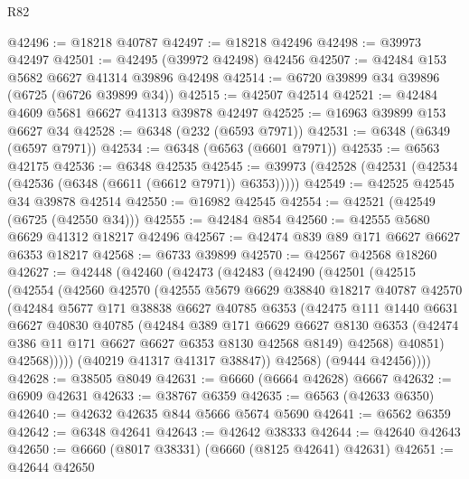 \begin{lexlean}{R82}
\begin{coremodule}
@42496 := @18218 @40787
@42497 := @18218 @42496
@42498 := @39973 @42497
@42501 := @42495 (@39972 @42498) @42456
@42507 := @42484 @153 @5682 @6627 @41314 @39896 @42498
@42514 := @6720 @39899 @34 @39896 (@6725 (@6726 @39899 @34))
@42515 := @42507 @42514
@42521 := @42484 @4609 @5681 @6627 @41313 @39878 @42497
@42525 := @16963 @39899 @153 @6627 @34
@42528 := @6348 (@232 (@6593 @7971))
@42531 := @6348 (@6349 (@6597 @7971))
@42534 := @6348 (@6563 (@6601 @7971))
@42535 := @6563 @42175
@42536 := @6348 @42535
@42545 := @39973 (@42528 (@42531 (@42534 (@42536 (@6348 (@6611 (@6612 @7971)) @6353)))))
@42549 := @42525 @42545 @34 @39878 @42514
@42550 := @16982 @42545
@42554 := @42521 (@42549 (@6725 (@42550 @34)))
@42555 := @42484 @854
@42560 := @42555 @5680 @6629 @41312 @18217 @42496
@42567 := @42474 @839 @89 @171 @6627 @6627 @6353 @18217
@42568 := @6733 @39899
@42570 := @42567 @42568 @18260
@42627 := @42448
    (@42460
      (@42473
        (@42483
          (@42490
            (@42501
              (@42515
                (@42554
                  (@42560
                    @42570
                    (@42555
                      @5679
                      @6629
                      @38840
                      @18217
                      @40787
                      @42570
                      (@42484
                        @5677
                        @171
                        @38838
                        @6627
                        @40785
                        @6353
                        (@42475
                          @111
                          @1440
                          @6631
                          @6627
                          @40830
                          @40785
                          (@42484
                            @389
                            @171
                            @6629
                            @6627
                            @8130
                            @6353
                            (@42474 @386 @11 @171 @6627 @6627 @6353 @8130 @42568 @8149)
                            @42568)
                          @40851)
                        @42568)))))
              (@40219 @41317 @41317 @38847))
            @42568)
          (@9444 @42456))))
@42628 := @38505 @8049
@42631 := @6660 (@6664 @42628) @6667
@42632 := @6909 @42631
@42633 := @38767 @6359
@42635 := @6563 (@42633 @6350)
@42640 := @42632 @42635 @844 @5666 @5674 @5690
@42641 := @6562 @6359
@42642 := @6348 @42641
@42643 := @42642 @38333
@42644 := @42640 @42643
@42650 := @6660 (@8017 @38331) (@6660 (@8125 @42641) @42631)
@42651 := @42644 @42650

\end{coremodule}
\end{lexlean}
